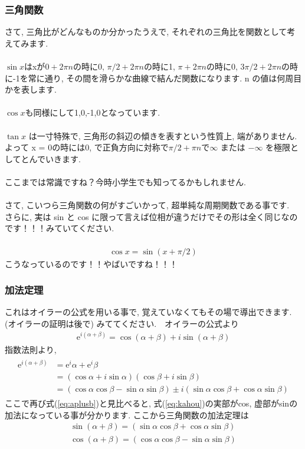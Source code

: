 \documentclass[11pt,a4paper]{jsarticle}
\begin{document}
\subsubsection{三角関数}
さて, 三角比がどんなものか分かったうえで, それぞれの三角比を関数として考えてみます.\\
\\
 $\sin x $はxが$0 + 2\pi n$の時に0, $\pi/2 + 2\pi n$の時に1, $\pi + 2\pi n$の時に0, $3\pi/2 + 2\pi n$の時に-1を常に通り, その間を滑らかな曲線で結んだ関数になります. n の値は何周目かを表します.\\
\\
$\cos x $も同様にして1,0,-1,0となっています. \\
\\
$\tan x$ は一寸特殊で, 三角形の斜辺の傾きを表すという性質上, 端がありません. よって x = 0の時には0, で正負方向に対称で$\pi/2 + \pi n$で$\infty$ または $-\infty$ を極限としてとんでいきます.\\
\\
ここまでは常識ですね？今時小学生でも知ってるかもしれません.\\
\\
さて, こいつら三角関数の何がすごいかって, 超単純な周期関数である事です. \\
さらに, 実は sin と cos に限って言えば位相が違うだけでその形は全く同じなのです！！！みていてください.\\
\\
\begin{eqnarray}
\cos x = \sin (x + \pi/2)
\end{eqnarray}
こうなっているのです！！やばいですね！！！
\\

\subsubsection{加法定理\label{addition_theorem}}
これはオイラーの公式を用いる事で, 覚えていなくてもその場で導出できます. (オイラーの証明は後で) みててください.　オイラーの公式より
\begin{eqnarray}
\mathrm{e}^{i(\alpha + \beta)} = \cos (\alpha + \beta) + i\sin (\alpha + \beta)
\label{eq:aplusb}
\end{eqnarray}
指数法則より,
\begin{eqnarray}
\begin{split}
\mathrm{e}^{i(\alpha + \beta)} &= \mathrm{e}^i\alpha + \mathrm{e}^i\beta \\ &= (\cos \alpha + i\sin\alpha)(\cos\beta + i\sin\beta) \\
&= (\cos\alpha\cos\beta - \sin\alpha\sin\beta)\pm i(\sin\alpha\cos\beta + \cos\alpha\sin\beta)
\end{split}
\label{eq:kahou}
\end{eqnarray}
ここで再び式(\ref{eq:aplusb})と見比べると, 式(\ref{eq:kahou})の実部がcos, 虚部がsinの加法になっている事が分かります. ここから三角関数の加法定理は
\begin{eqnarray}
\sin (\alpha + \beta) = (\sin\alpha\cos\beta + \cos\alpha\sin\beta)\\
\cos (\alpha + \beta) = (\cos\alpha\cos\beta - \sin\alpha\sin\beta)
\label{kahouteiri}
\end{eqnarray}
\end{document}
